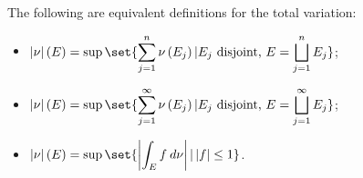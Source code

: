 \documentclass[10pt]{mypackage}
\begin{document}
\begin{proposition}
  The following are equivalent definitions for the total variation:
  \begin{itemize}
    \item $\displaystyle \left\vert \nu \right\vert\left( E \right) = \sup\set{\sum_{j=1}^{n}\nu\left( E_j \right) | E_j\text{ disjoint, }E = \bigsqcup_{j=1}^{n}E_j}$;
    \item $\displaystyle \left\vert \nu \right\vert\left( E \right) = \sup\set{\sum_{j=1}^{\infty}\nu\left( E_j \right) | E_j\text{ disjoint, }E = \bigsqcup_{j=1}^{\infty}E_j}$;
    \item $\displaystyle \left\vert \nu \right\vert\left( E \right) = \sup\set{\left\vert \int_{E}^{} f\:d\nu \right\vert | \left\vert f \right\vert\leq 1}$.
  \end{itemize}
\end{proposition}
\end{document}
